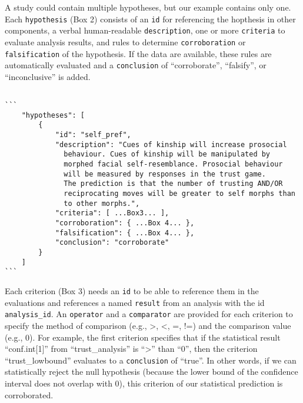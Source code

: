 \documentclass[english,doc,floatsintext]{apa6}
\begin{document}
A study could contain multiple hypotheses, but our example contains only one. Each \texttt{hypothesis} (Box 2) consists of an \texttt{id} for referencing the hopthesis in other components, a verbal human-readable \texttt{description}, one or more \texttt{criteria} to evaluate analysis results, and rules to determine \texttt{corroboration} or \texttt{falsification} of the hypothesis. If the data are available, these rules are automatically evaluated and a \texttt{conclusion} of \enquote{corroborate}, \enquote{falsify}, or \enquote{inconclusive} is added.

\begin{tcolorbox}[colback=black!5!white,colframe=white!5!black,title=Box 2. The hypothesis component.]
\begin{verbatim}

```
    "hypotheses": [
        {
            "id": "self_pref",
            "description": "Cues of kinship will increase prosocial
              behaviour. Cues of kinship will be manipulated by
              morphed facial self-resemblance. Prosocial behaviour
              will be measured by responses in the trust game.
              The prediction is that the number of trusting AND/OR
              reciprocating moves will be greater to self morphs than
              to other morphs.",
            "criteria": [ ...Box3... ],
            "corroboration": { ...Box 4... },
            "falsification": { ...Box 4... },
            "conclusion": "corroborate"
        }
    ]
```

\end{verbatim}
\end{tcolorbox}

Each criterion (Box 3) needs an \texttt{id} to be able to reference them in the evaluations and references a named \texttt{result} from an analysis with the id \texttt{analysis\_id}. An \texttt{operator} and a \texttt{comparator} are provided for each criterion to specify the method of comparison (e.g., \textgreater{}, \textless{}, =, !=) and the comparison value (e.g., 0). For example, the first criterion specifies that if the statistical result \enquote{conf.int{[}1{]}} from \enquote{trust\_analysis} is \enquote{\textgreater{}} than \enquote{0}, then the criterion \enquote{trust\_lowbound} evaluates to a \texttt{conclusion} of \enquote{true}. In other words, if we can statistically reject the null hypothesis (because the lower bound of the confidence interval does not overlap with 0), this criterion of our statistical prediction is corroborated.
\end{document}
